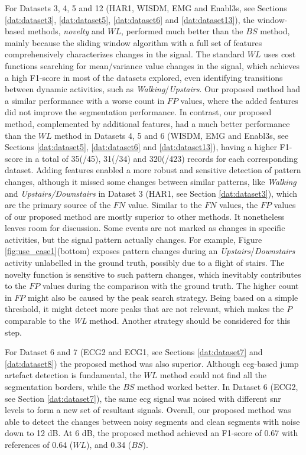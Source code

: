 For Datasets 3, 4, 5 and 12 (HAR1, WISDM, EMG and Enabl3s, see Sections \ref{dat:dataset3}, \ref{dat:dataset5}, \ref{dat:dataset6} and \ref{dat:dataset13}), the window-based methods, \textit{novelty} and $WL$, performed much better than the $BS$ method, mainly because the sliding window algorithm with a full set of features comprehensively characterizes changes in the signal.
The standard $WL$ uses cost functions searching for mean/variance value changes in the signal, which achieves a high F1-score in most of the datasets explored, even identifying transitions between dynamic activities, such as \textit{Walking}/\textit{Upstairs}.
Our proposed method had a similar performance with a worse count in $FP$ values, where the added features did not improve the segmentation performance.
In contrast, our proposed method, complemented by additional features, had a much better performance than the $WL$ method in Datasets 4, 5 and 6 (WISDM, EMG and Enabl3s, see Sections \ref{dat:dataset5}, \ref{dat:dataset6} and \ref{dat:dataset13}), having a higher F1-score in a total of 35(/45), 31(/34) and 320(/423) records for each corresponding dataset.
Adding features enabled a more robust and sensitive detection of pattern changes, although it missed some changes between similar patterns, like \textit{Walking} and \textit{Upstairs/Downstairs} in Dataset 3 (HAR1, see Section \ref{dat:dataset3}), which are the primary source of the $FN$ value.
Similar to the $FN$ values, the $FP$ values of our proposed method are mostly superior to other methods. It nonetheless leaves room for discussion. Some events are not marked as changes in specific activities, but the signal pattern actually changes. For example, Figure \ref{fig:use_case1}(bottom) exposes pattern changes during an \textit{Upstairs}/\textit{Downstairs} activity unlabelled in the ground truth, possibly due to a flight of stairs. The novelty function is sensitive to such pattern changes, which inevitably contributes to the $FP$ values during the comparison with the ground truth. The higher count in $FP$ might also be caused by the peak search strategy. Being based on a simple threshold, it might detect more peaks that are not relevant, which makes the $P$ comparable to the \textit{WL} method. Another strategy should be considered for this step.

For Dataset 6 and 7 (ECG2 and ECG1, see Sections \ref{dat:dataset7} and \ref{dat:dataset8}) the proposed method was also superior. Although \gls{ecg}-based jump artefact detection is fundamental, the $WL$ method could not find all the segmentation borders, while the $BS$ method worked better. In Dataset 6 (ECG2, see Section \ref{dat:dataset7}), the same \gls{ecg} signal was noised with different \gls{snr} levels to form a new set of resultant signals. Overall, our proposed method was able to detect the changes between noisy segments and clean segments with noise down to 12 dB. At 6 dB, the proposed method achieved an F1-score of 0.67 with references of 0.64 ($WL$), and 0.34 ($BS$).

